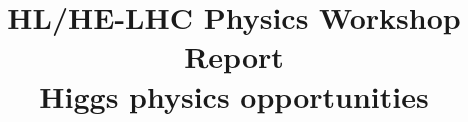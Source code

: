 \documentclass[11pt,twoside,a4paper]{cernrep}
\def\bibfiles{\main/bib/chapter,\main/section1/bib/section,\main/section2/bib/section,\main/section3/bib/section,\main/section4/bib/section,\main/section5/bib/section,\main/section6/bib/section,\main/section7/bib/section,\main/section8/bib/section,\main/section9/bib/section,\main/section10/bib/section}
\providecommand{\biblio}{\nocite{article-minimal}\clearpage}  %
\begin{document}

\def\lra#1{\overset{\text{\scriptsize$\leftrightarrow$}}{#1}}

\def\biblio{}

\title{HL/HE-LHC Physics Workshop Report \\[5mm]
  Higgs physics opportunities}

% 
%
% 

\maketitle
% 
%
% 
\begin{abstract}






\end{abstract}

\setcounter{tocdepth}{3}
\tableofcontents
\newpage


\newpage

\newpage

\newpage
%
\newpage

\newpage

\newpage

\newpage

\newpage

\newpage

\newpage





\end{document}
